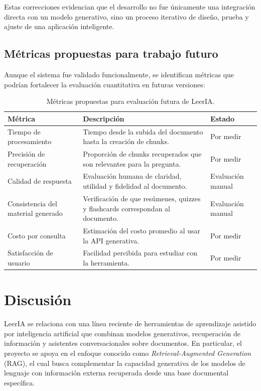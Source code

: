 \documentclass[12pt, letterpaper]{article}
\begin{document}
	Estas correcciones evidencian que el desarrollo no fue únicamente una integración directa con un modelo generativo, sino un proceso iterativo de diseño, prueba y ajuste de una aplicación inteligente.
	
	\subsection{Métricas propuestas para trabajo futuro}
	
	Aunque el sistema fue validado funcionalmente, se identifican métricas que podrían fortalecer la evaluación cuantitativa en futuras versiones:
	
	\begin{table}[H]
		\centering
		\renewcommand{\arraystretch}{1.3}
		\begin{tabularx}{\textwidth}{p{4cm} X p{3cm}}
			\toprule
			\textbf{Métrica} & \textbf{Descripción} & \textbf{Estado} \\
			\midrule
			Tiempo de procesamiento & Tiempo desde la subida del documento hasta la creación de chunks. & Por medir \\
			\midrule
			Precisión de recuperación & Proporción de chunks recuperados que son relevantes para la pregunta. & Por medir \\
			\midrule
			Calidad de respuesta & Evaluación humana de claridad, utilidad y fidelidad al documento. & Evaluación manual \\
			\midrule
			Consistencia del material generado & Verificación de que resúmenes, quizzes y flashcards correspondan al documento. & Evaluación manual \\
			\midrule
			Costo por consulta & Estimación del costo promedio al usar la API generativa. & Por medir \\
			\midrule
			Satisfacción de usuario & Facilidad percibida para estudiar con la herramienta. & Por medir \\
			\bottomrule
		\end{tabularx}
		\caption{Métricas propuestas para evaluación futura de LeerIA.}
	\end{table}
	

	\section{Discusión}
	
	LeerIA se relaciona con una línea reciente de herramientas de aprendizaje asistido por inteligencia artificial que combinan modelos generativos, recuperación de información y asistentes conversacionales sobre documentos. En particular, el proyecto se apoya en el enfoque conocido como \textit{Retrieval-Augmented Generation} (RAG), el cual busca complementar la capacidad generativa de los modelos de lenguaje con información externa recuperada desde una base documental específica.
	
\end{document}
